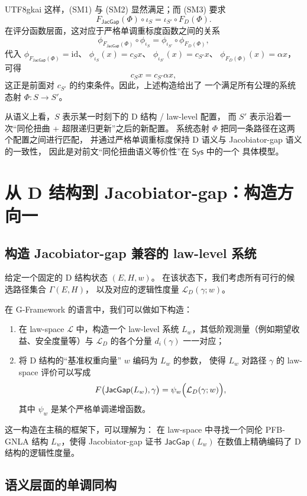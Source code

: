 \documentclass[12pt]{article}
\newcommand{\JacGap}{\mathsf{JacGap}}
\begin{document}
\begin{CJK*}{UTF8}{gkai}
这样，(SM1) 与 (SM2) 显然满足；而 (SM3) 要求
\[
  F_{\JacGap}(\Phi)\circ\iota_S
  =
  \iota_{S'}\circ F_D(\Phi).
\]
在评分函数层面，这对应于严格单调重标度函数之间的关系
\[
  \phi_{F_{\JacGap}(\Phi)}\circ\phi_{\iota_S}
  =
  \phi_{\iota_{S'}}\circ\phi_{F_D(\Phi)},
\]
代入
$\phi_{F_{\JacGap}(\Phi)}=\mathrm{id}$、
$\phi_{\iota_S}(x)=c_S x$、
$\phi_{\iota_{S'}}(x)=c_{S'} x$、
$\phi_{F_D(\Phi)}(x)=\alpha x$，
可得
\[
  c_S x = c_{S'}\alpha x,
\]
这正是前面对 $c_{S'}$ 的约束条件。因此，上述构造给出了
一个满足所有公理的系统态射 $\Phi:S\to S'$。

从语义上看，$S$ 表示某一时刻下的 D 结构 / law-level 配置，
而 $S'$ 表示沿着一次“同伦扭曲 + 超限递归更新”之后的新配置。
系统态射 $\Phi$ 把同一条路径在这两个配置之间进行匹配，
并通过严格单调重标度保持 D 语义与 Jacobiator-gap 语义的一致性，
因此是对前文“同伦扭曲语义等价性”在 $\mathsf{Sys}$ 中的一个
具体模型。

\section{从 D 结构到 Jacobiator-gap：构造方向一}

\subsection{构造 Jacobiator-gap 兼容的 law-level 系统}

给定一个固定的 D 结构状态 $(E,H,w)$。
在该状态下，我们考虑所有可行的候选路径集合 $\Gamma(E,H)$，
以及对应的逻辑性度量
$\mathcal{L}_D(\gamma;w)$。

在 G-Framework 的语言中，我们可以做如下构造：
\begin{enumerate}
  \item 在 law-space $\mathcal{L}$ 中，构造一个 law-level 系统
        $L_w$，其低阶观测量（例如期望收益、安全度量等）与
        $\mathcal{L}_D$ 的各个分量 $d_i(\gamma)$ 一一对应；
  \item 将 D 结构的“基准权重向量” $w$ 编码为 $L_w$ 的参数，
        使得 $L_w$ 对路径 $\gamma$ 的 law-space 评价可以写成
        \[
          F\bigl(\JacGap(L_w),\gamma\bigr)
          = \psi_w\Bigl(\mathcal{L}_D(\gamma;w)\Bigr),
        \]
        其中 $\psi_w$ 是某个严格单调递增函数。
\end{enumerate}

这一构造在主稿的框架下，可以理解为：
在 law-space 中寻找一个同伦 PFB-GNLA 结构 $L_w$，使得
Jacobiator-gap 证书 $\JacGap(L_w)$ 在数值上精确编码了
D 结构的逻辑性度量。

\subsection{语义层面的单调同构}


\end{CJK*}
\end{document}
